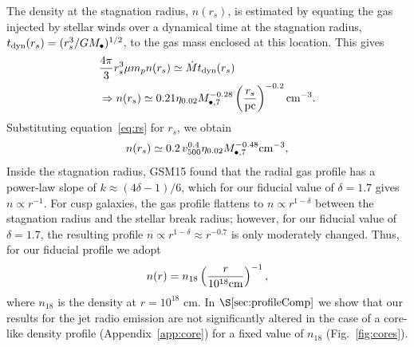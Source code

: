 \documentclass[usenatbib,fleqn]{mnras}
\newcommand{\Mbh}[1][]{M_{\bullet#1}}
\newcommand{\rs}{r_s}
\begin{document}
The density at the stagnation radius, $n(\rs)$, is estimated by
equating the gas injected by stellar winds over a dynamical time at
the stagnation radius, $t_{\rm dyn} (\rs)=(\rs^3/G \Mbh)^{1/2}$, to
the gas mass enclosed at this location.  This gives
\begin{align}
  &\frac{4 \pi}{3} \rs^3 \mu m_p n(r_s) \simeq \dot{M} t_{\rm dyn}
  (\rs) \nonumber\\
  &\Rightarrow n(r_s) \simeq 0.21 \eta_{0.02} \Mbh[,7]^{-0.28} \left(\frac{r_s}{\rm
      pc}\right)^{-0.2} {\rm cm}^{-3}.
\label{eq:nrs}
\end{align}
%
Substituting equation~\eqref{eq:rs} for $r_s$, we obtain 
\begin{equation}
n(r_s) \simeq 0.2 \, v_{500}^{0.4} \eta_{0.02} \Mbh[,7]^{-0.48} {\rm cm}^{-3},
\label{eq:nrs2}
\end{equation}
%
Inside the stagnation radius, GSM15 found that the radial gas profile
has a power-law slope of $k \approx (4\delta-1)/6$, which for our
fiducial value of $\delta=1.7$ gives $n \propto r^{-1}$.  For cusp
galaxies, the gas profile flattens to $n\propto r^{1-\delta}$ between
the stagnation radius and the stellar break radius; however, for our
fiducial value of $\delta = 1.7$, the resulting profile $n\propto
r^{1-\delta} \approx r^{-0.7}$ is only moderately changed.  Thus, for
our fiducial profile we adopt 
\begin{equation} n(r)= n_{18} \left(\frac{r}{10^{18}
    {\rm cm}}\right)^{-1},
\label{eq:profile}
\end{equation}
where $n_{18}$ is the density at $r = 10^{18}$ cm.  In
$\S\ref{sec:profileComp}$ we show that our results for the jet radio
emission are not significantly altered in the case of a core-like
density profile (Appendix~\ref{app:core}) for a fixed value of
$n_{18}$ (Fig.~\ref{fig:cores}).
\end{document}
